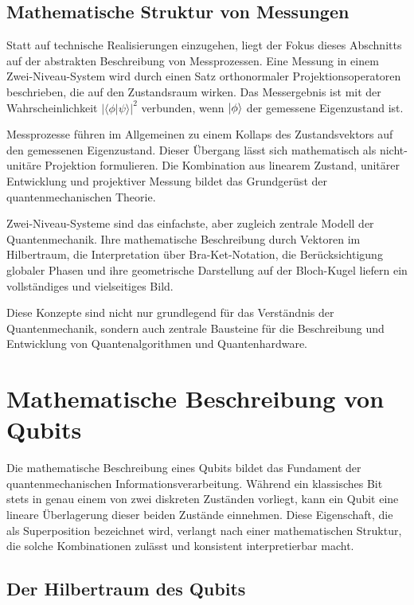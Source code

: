 \subsection{Mathematische Struktur von Messungen}
\label{subsec: Mathematische Struktur von Messungen}
Statt auf technische Realisierungen einzugehen, liegt der Fokus dieses Abschnitts auf der abstrakten Beschreibung von Messprozessen. Eine Messung in einem Zwei-Niveau-System wird durch einen Satz orthonormaler Projektionsoperatoren beschrieben, die auf den Zustandsraum wirken. Das Messergebnis ist mit der Wahrscheinlichkeit $|\langle\phi|\psi\rangle|^2$ verbunden, wenn $\ket{\phi}$ der gemessene Eigenzustand ist.

Messprozesse führen im Allgemeinen zu einem Kollaps des Zustandsvektors auf den gemessenen Eigenzustand. Dieser Übergang lässt sich mathematisch als nicht-unitäre Projektion formulieren. Die Kombination aus linearem Zustand, unitärer Entwicklung und projektiver Messung bildet das Grundgerüst der quantenmechanischen Theorie.


Zwei-Niveau-Systeme sind das einfachste, aber zugleich zentrale Modell der Quantenmechanik. Ihre mathematische Beschreibung durch Vektoren im Hilbertraum, die Interpretation über Bra-Ket-Notation, die Berücksichtigung globaler Phasen und ihre geometrische Darstellung auf der Bloch-Kugel liefern ein vollständiges und vielseitiges Bild.

Diese Konzepte sind nicht nur grundlegend für das Verständnis der Quantenmechanik, sondern auch zentrale Bausteine für die Beschreibung und Entwicklung von Quantenalgorithmen und Quantenhardware.



\section{Mathematische Beschreibung von Qubits}
\label{Mathematische Beschreibung von Qubits}

Die mathematische Beschreibung eines Qubits bildet das Fundament der quantenmechanischen Informationsverarbeitung. Während ein klassisches Bit stets in genau einem von zwei diskreten Zuständen vorliegt, kann ein Qubit eine lineare Überlagerung dieser beiden Zustände einnehmen. Diese Eigenschaft, die als Superposition bezeichnet wird, verlangt nach einer mathematischen Struktur, die solche Kombinationen zulässt und konsistent interpretierbar macht.

\subsection{Der Hilbertraum des Qubits}
\label{subsec: Der Hilbertraum des Qubits}


